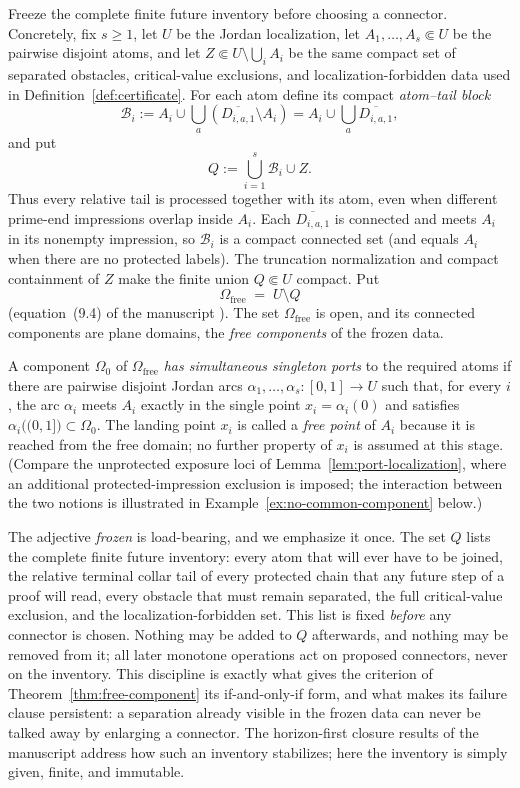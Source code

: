 \documentclass[11pt,reqno]{amsart}
\theoremstyle{definition}
\theoremstyle{remark}
\newcommand{\Omfree}{\Omega_{\mathrm{free}}}
\begin{document}
Freeze the complete finite future inventory before choosing a connector.
Concretely, fix $s\ge1$, let $U$ be the Jordan localization, let
$A_1,\dots,A_s\Subset U$ be the pairwise disjoint atoms, and let
$Z\Subset U\setminus\bigcup_iA_i$ be the same compact set of separated
obstacles, critical-value exclusions, and localization-forbidden data used
in Definition~\ref{def:certificate}.  For each atom define its compact
\emph{atom--tail block}
\[
\mathcal B_i:=
A_i\cup\bigcup_a(\overline{D_{i,a,1}}\setminus A_i)
=A_i\cup\bigcup_a\overline{D_{i,a,1}},
\]
and put
\[
Q:=\bigcup_{i=1}^{s}\mathcal B_i\cup Z.
\]
Thus every relative tail is processed together with its atom, even when
different prime-end impressions overlap inside $A_i$.  Each
$\overline{D_{i,a,1}}$ is connected and meets $A_i$ in its nonempty
impression, so $\mathcal B_i$ is a compact connected set (and equals $A_i$ when
there are no protected labels).  The truncation normalization and compact
containment of $Z$ make the finite union $Q\Subset U$ compact.  Put
\begin{equation}\label{eq:D-free-domain}
\Omfree \;=\; U\setminus Q
\end{equation}
(equation~(9.4) of the manuscript \cite{MWman}). The set $\Omfree$ is open, and its
connected components are plane domains, the \emph{free components} of the frozen data.

A component $\Omega_0$ of $\Omfree$ \emph{has simultaneous singleton ports} to the
required atoms if there are pairwise disjoint Jordan arcs
$\alpha_1,\dots,\alpha_s\colon[0,1]\to U$ such that, for every $i$, the arc $\alpha_i$
meets $A_i$ exactly in the single point $x_i=\alpha_i(0)$ and satisfies
$\alpha_i\bigl((0,1]\bigr)\subset\Omega_0$. The landing point $x_i$ is called a
\emph{free point} of $A_i$ because it is reached from the free domain; no further
property of $x_i$ is assumed at this stage. (Compare the unprotected exposure loci of
Lemma~\ref{lem:port-localization}, where an additional protected-impression exclusion is
imposed; the interaction between the two notions is illustrated in
Example~\ref{ex:no-common-component} below.)

The adjective \emph{frozen} is load-bearing, and we emphasize it once. The set $Q$ lists
the complete finite future inventory: every atom that will ever have to be joined, the
relative terminal collar tail of every protected chain that any future step of a proof will
read, every obstacle that must remain separated, the full critical-value exclusion, and
the localization-forbidden set. This list is fixed \emph{before} any connector is chosen.
Nothing may be added to $Q$ afterwards, and nothing may be removed from it; all later
monotone operations act on proposed connectors, never on the inventory. This discipline
is exactly what gives the criterion of Theorem~\ref{thm:free-component} its
if-and-only-if form, and what makes its failure clause persistent: a separation already
visible in the frozen data can never be talked away by enlarging a connector. The
horizon-first closure results of the manuscript \cite{MWman} address how such an
inventory stabilizes; here the inventory is simply given, finite, and immutable.
\end{document}
